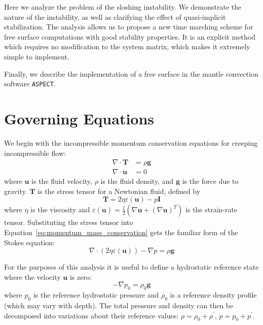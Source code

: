 \documentclass[preprint,12pt,authoryear]{elsarticle}
\begin{document}
Here we analyze the problem of the sloshing instability.  We demonstrate the nature of the instability, 
as well as clarifying the effect of quasi-implicit stabilization.
The analysis allows us to propose a new time marching scheme for free surface computations with 
good stability properties. It is an explicit method which requires no modification to the system matrix,
which makes it extremely simple to implement.

Finally, we describe the implementation of a free surface in the mantle convection software \texttt{ASPECT}. 

\section{Governing Equations}
\label{sec:governing}

We begin with the incompressible momentum conservation equations for creeping incompressible flow:
\begin{equation}
\begin{aligned}
\nabla \cdot \mathbf{T} &= \rho \mathbf{g} \\
\nabla \cdot \mathbf{u} &= 0
\end{aligned}
\label{eq:momentum_mass_conservation}
\end{equation}
where $\mathbf{u}$ is the fluid velocity, $\rho$ is the fluid density, and $\mathbf{g}$ is the force due to gravity.
$\mathbf{T}$ is the stress tensor for a Newtonian fluid, defined by
\begin{equation}
\mathbf{T} = 2 \eta \varepsilon(\mathbf{u}) - p \mathbf{I}
\label{eq:stress_tensor}
\end{equation}
where $\eta$ is the viscosity and $\varepsilon(\mathbf{u}) = \frac{1}{2}(\nabla \mathbf{u} + (\nabla \mathbf{u} )^T )$ is the strain-rate tensor.
Substituting the stress tensor into Equation~\eqref{eq:momentum_mass_conservation} gets the familiar form of the Stokes equation:
\begin{equation}
\nabla \cdot \left( 2 \eta \varepsilon( \mathbf{u} ) \right) - \nabla p = \rho \mathbf{g}
\label{eq:stokes}
\end{equation}

For the purposes of this analysis it is useful to define a hydrostatic reference state where the 
velocity $\mathbf{u}$ is zero:
\begin{equation}
- \nabla p_0 = \rho_0 \mathbf{g}
\label{eq:hydrostatic_stokes}
\end{equation}
where $p_0$ is the reference hydrostatic pressure and $\rho_0$ is a reference density profile (which may vary with depth).
The total pressure and density can then be decomposed into variations about their 
reference values: $\rho = \rho_0 + \rho^\prime$, $p = p_0 + p^\prime$. 
\end{document}
